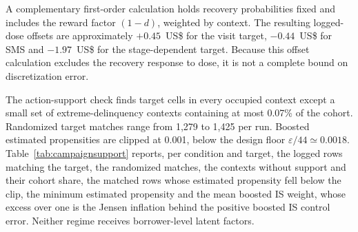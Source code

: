 A complementary first-order calculation holds recovery probabilities fixed and includes the reward factor $(1-d)$, weighted by context. The resulting logged-dose offsets are approximately $+0.45$~US\$ for the visit target, $-0.44$~US\$ for SMS and $-1.97$~US\$ for the stage-dependent target. Because this offset calculation excludes the recovery response to dose, it is not a complete bound on discretization error.

The action-support check finds target cells in every occupied context except a small set of extreme-delinquency contexts containing at most 0.07\% of the cohort. Randomized target matches range from 1,279 to 1,425 per run. Boosted estimated propensities are clipped at 0.001, below the design floor $\varepsilon/44\simeq0.0018$. Table~\ref{tab:campaignsupport} reports, per condition and target, the logged rows matching the target, the randomized matches, the contexts without support and their cohort share, the matched rows whose estimated propensity fell below the clip, the minimum estimated propensity and the mean boosted IS weight, whose excess over one is the Jensen inflation behind the positive boosted IS control error. Neither regime receives borrower-level latent factors.



